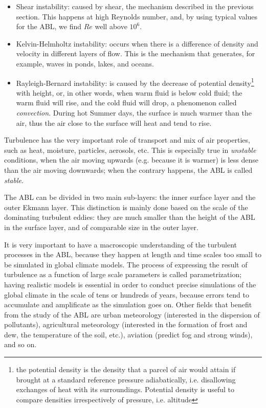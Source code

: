 \documentclass[12pt]{book}
\begin{document}
\begin{itemize}
\item Shear instability: caused by shear, the mechanism described in the previous section. This happens at high Reynolds number, and, by using typical values for the ABL, we find $Re$ well above $10^6$.
\item Kelvin-Helmholtz instability: occurs when there is a difference of density and velocity in different layers of flow. This is the mechanism that generates, for example, waves in ponds, lakes, and oceans.
\item Rayleigh-Bernard instability: is caused by the decrease of potential density\footnote{the potential density is the density that a parcel of air would attain if brought at a standard reference pressure adiabatically, i.e. disallowing exchanges of heat with its surroundings. Potential density is useful to compare densities irrespectively of pressure, i.e. altitude} with height, or, in other words, when warm fluid is below cold fluid; the warm fluid will rise, and the cold fluid will drop, a phenomenon called \emph{convection}. During hot Summer days, the surface is much warmer than the air, thus the air close to the surface will heat and tend to rise.
\end{itemize}

Turbulence has the very important role of transport and mix of air properties, such as heat, moisture, particles, aerosols, etc. This is especially true in \emph{unstable} conditions, when the air moving upwards (e.g. because it is warmer) is less dense than the air moving downwards; when the contrary happens, the ABL is called \emph{stable}.

The ABL can be divided in two main sub-layers: the inner surface layer and the outer Ekmann layer. This distinction is mainly done based on the scale of the dominating turbulent eddies: they are much smaller than the height of the ABL in the surface layer, and of comparable size in the outer layer.

It is very important to have a macroscopic understanding of the turbulent processes in the ABL, because they happen at length and time scales too small to be simulated in global climate models. The process of expressing the result of turbulence as a function of large scale parameters is called parametrization; having realistic models is essential in order to conduct precise simulations of the global climate in the scale of tens or hundreds of years, because errors tend to accumulate and amplificate as the simulation goes on. Other fields that benefit from the study of the ABL are urban meteorology (interested in the dispersion of pollutants), agricultural meteorology (interested in the formation of frost and dew, the temperature of the soil, etc.), aviation (predict fog and strong winds), and so on.
\end{document}
